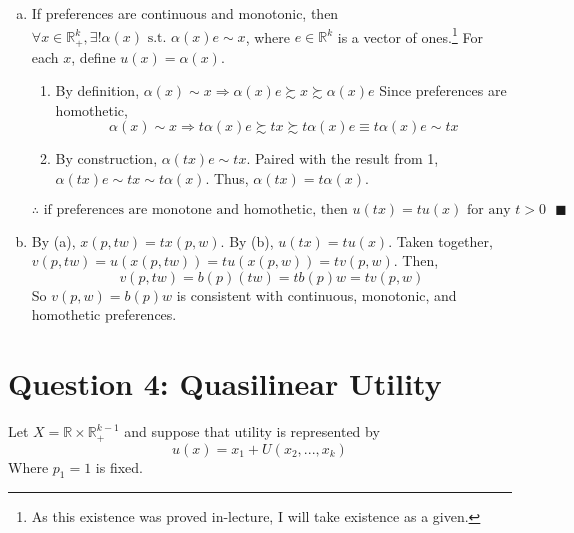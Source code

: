 \documentclass{article}
\newcommand{\R}{\mathbb{R}}
\begin{document}
\begin{enumerate}[(a)]
	\item If preferences are continuous and monotonic, then ${\forall x\in\R^k_+,\exists !\alpha(x)\text{ s.t. }\alpha(x)e\sim x}$, where $e\in\R^k$ is a vector of ones.\footnote{As this existence was proved in-lecture, I will take existence as a given.} For each $x$, define $u(x)=\alpha(x)$.
		\begin{enumerate}[1.]
			\item By definition, ${\alpha(x)\sim x\Rightarrow\alpha(x)e\succsim x\succsim\alpha(x)e}$ Since preferences are homothetic, 
				\[
					\alpha(x)\sim x\Rightarrow t\alpha(x)e\succsim tx\succsim t\alpha(x)e \equiv t\alpha(x)e\sim tx
				\]
				
			\item By construction, $\alpha(tx)e\sim tx$. Paired with the result from 1, ${\alpha(tx)e\sim tx\sim t\alpha(x)}$. Thus, ${\alpha(tx)=t\alpha(x)}$. 
		\end{enumerate}
		\[
			\therefore\text{ if preferences are monotone and homothetic, then } u(tx)= tu(x)\text{ for any }t>0\text{ }\blacksquare
		\]
	
	\item By (a), $x(p,tw)=tx(p,w)$. By (b), $u(tx)=tu(x)$. Taken together, ${v(p,tw) = u(x(p,tw)) = tu(x(p,w)) = tv(p,w)}$. Then,
		\[
			v(p,tw) = b(p)(tw) = tb(p)w = tv(p,w)
		\]
		So $v(p,w)=b(p)w$ is consistent with continuous, monotonic, and homothetic preferences. 
	
\end{enumerate}


\section*{Question 4: Quasilinear Utility}
Let $X=\R\times\R^{k-1}_+$ and suppose that utility is represented by
\[
	u(x) = x_1 + U(x_2,...,x_k)
\]
Where $p_1=1$ is fixed.
\end{document}
